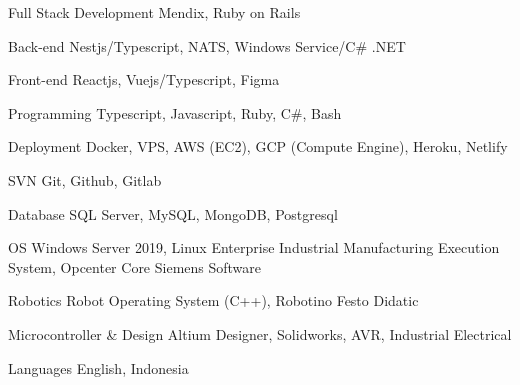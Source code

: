 

\begin{cvskills}
  \cvskill
    {Full Stack Development} %
    {Mendix, Ruby on Rails} %

  \cvskill
    {Back-end} %
    {Nestjs/Typescript, NATS, Windows Service/C\# .NET} %

  \cvskill
    {Front-end} %
    {Reactjs, Vuejs/Typescript, Figma} %

  \cvskill
    {Programming} %
    {Typescript, Javascript, Ruby, C\#, Bash} %

  \cvskill
    {Deployment} %
    {Docker, VPS, AWS (EC2), GCP (Compute Engine), Heroku, Netlify } %

  \cvskill
    {SVN} %
    {Git, Github, Gitlab} %

  \cvskill
    {Database} %
    {SQL Server, MySQL, MongoDB, Postgresql} %

  \cvskill
    {OS} %
    {Windows Server 2019, Linux} %
  \cvskill
    {Enterprise Industrial} %
    {Manufacturing Execution System, Opcenter Core Siemens Software} %

  \cvskill
    {Robotics} %
    {Robot Operating System (C++), Robotino Festo Didatic} %


  \cvskill
    {Microcontroller \& Design} %
    {Altium Designer, Solidworks, AVR, Industrial Electrical} %

  \cvskill
  {Languages} %
  {English, Indonesia} %

\end{cvskills}
